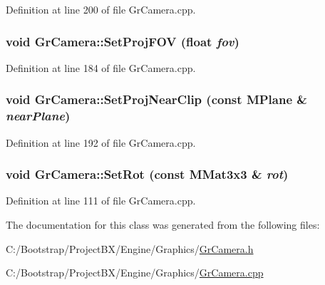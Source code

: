 Definition at line 200 of file GrCamera.cpp.\hypertarget{class_gr_camera_66224fc504eb32b51038fd50b23d29d0}{
\subsubsection[{SetProjFOV}]{\setlength{\rightskip}{0pt plus 5cm}void GrCamera::SetProjFOV (float {\em fov})}}
\label{class_gr_camera_66224fc504eb32b51038fd50b23d29d0}




Definition at line 184 of file GrCamera.cpp.\hypertarget{class_gr_camera_9396b50cce353396f3d8c7b9527632bb}{
\subsubsection[{SetProjNearClip}]{\setlength{\rightskip}{0pt plus 5cm}void GrCamera::SetProjNearClip (const {\bf MPlane} \& {\em nearPlane})}}
\label{class_gr_camera_9396b50cce353396f3d8c7b9527632bb}




Definition at line 192 of file GrCamera.cpp.\hypertarget{class_gr_camera_8c8f33ad67141bad930c367ffa9db7ac}{
\subsubsection[{SetRot}]{\setlength{\rightskip}{0pt plus 5cm}void GrCamera::SetRot (const {\bf MMat3x3} \& {\em rot})}}
\label{class_gr_camera_8c8f33ad67141bad930c367ffa9db7ac}




Definition at line 111 of file GrCamera.cpp.

The documentation for this class was generated from the following files:\begin{CompactItemize}
\item 
C:/Bootstrap/ProjectBX/Engine/Graphics/\hyperlink{_gr_camera_8h}{GrCamera.h}\item 
C:/Bootstrap/ProjectBX/Engine/Graphics/\hyperlink{_gr_camera_8cpp}{GrCamera.cpp}\end{CompactItemize}
